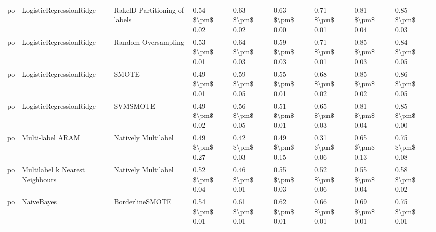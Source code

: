 \begin{tabular}{lllllllll}
      po &         LogisticRegressionRidge & RakelD Partitioning of labels &     0.54 \$\textbackslash pm\$ 0.02 &           0.63 \$\textbackslash pm\$ 0.02 &       0.63 \$\textbackslash pm\$ 0.00 &        0.71 \$\textbackslash pm\$ 0.01 &                         0.81 \$\textbackslash pm\$ 0.04 &     0.85 \$\textbackslash pm\$ 0.03 \\
      po &         LogisticRegressionRidge &           Random Oversampling &     0.53 \$\textbackslash pm\$ 0.01 &           0.64 \$\textbackslash pm\$ 0.03 &       0.59 \$\textbackslash pm\$ 0.03 &        0.71 \$\textbackslash pm\$ 0.01 &                         0.85 \$\textbackslash pm\$ 0.03 &     0.84 \$\textbackslash pm\$ 0.05 \\
      po &         LogisticRegressionRidge &                         SMOTE &     0.49 \$\textbackslash pm\$ 0.01 &           0.59 \$\textbackslash pm\$ 0.05 &       0.55 \$\textbackslash pm\$ 0.01 &        0.68 \$\textbackslash pm\$ 0.02 &                         0.85 \$\textbackslash pm\$ 0.02 &     0.86 \$\textbackslash pm\$ 0.05 \\
      po &         LogisticRegressionRidge &                      SVMSMOTE &     0.49 \$\textbackslash pm\$ 0.02 &           0.56 \$\textbackslash pm\$ 0.05 &       0.51 \$\textbackslash pm\$ 0.01 &        0.65 \$\textbackslash pm\$ 0.03 &                         0.81 \$\textbackslash pm\$ 0.04 &     0.85 \$\textbackslash pm\$ 0.00 \\
      po &                Multi-label ARAM &           Natively Multilabel &     0.49 \$\textbackslash pm\$ 0.27 &           0.42 \$\textbackslash pm\$ 0.03 &       0.49 \$\textbackslash pm\$ 0.15 &        0.31 \$\textbackslash pm\$ 0.06 &                         0.65 \$\textbackslash pm\$ 0.13 &     0.75 \$\textbackslash pm\$ 0.08 \\
      po & Multilabel k Nearest Neighbours &           Natively Multilabel &     0.52 \$\textbackslash pm\$ 0.04 &           0.46 \$\textbackslash pm\$ 0.01 &       0.55 \$\textbackslash pm\$ 0.03 &        0.52 \$\textbackslash pm\$ 0.06 &                         0.55 \$\textbackslash pm\$ 0.04 &     0.58 \$\textbackslash pm\$ 0.02 \\
      po &                      NaiveBayes &               BorderlineSMOTE &     0.54 \$\textbackslash pm\$ 0.01 &           0.61 \$\textbackslash pm\$ 0.01 &       0.62 \$\textbackslash pm\$ 0.01 &        0.66 \$\textbackslash pm\$ 0.01 &                         0.69 \$\textbackslash pm\$ 0.01 &     0.75 \$\textbackslash pm\$ 0.01 \\

\end{tabular}
